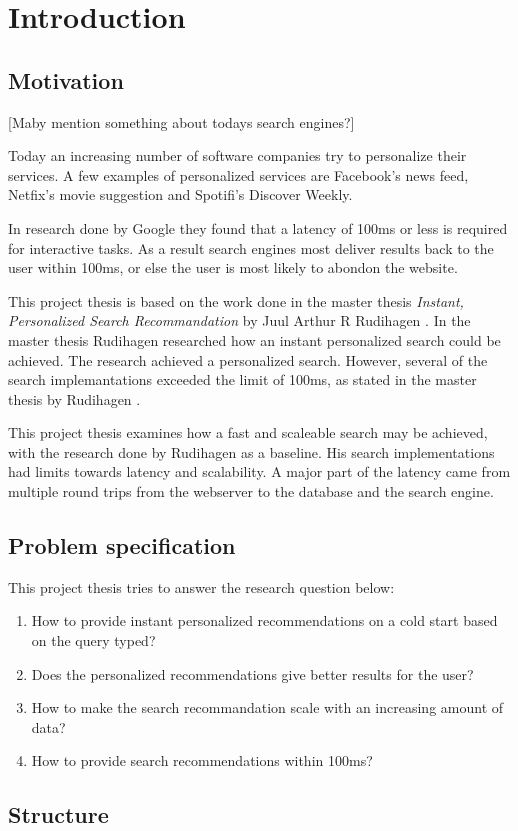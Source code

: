 \chapter{Introduction}
\section{Motivation}
[Maby mention something about todays search engines?]

Today an increasing number of software companies try to personalize their services.
A few examples of personalized services are Facebook's news feed, Netfix's movie suggestion and Spotifi's Discover Weekly.

In research done by Google \cite{google-latency} they found that a latency of 100ms or less is required for interactive tasks.
As a result search engines most deliver results back to the user within 100ms, or else the user is most likely to abondon the website.

This project thesis is based on the work done in the master thesis \textit{Instant, Personalized Search Recommandation} by Juul Arthur R Rudihagen \cite{master-thesis}.
In the master thesis Rudihagen researched how an instant personalized search could be achieved.
The research achieved a personalized search.
However, several of the search implemantations exceeded the limit of 100ms, as stated in the master thesis by Rudihagen \cite[sec 6.6]{master-thesis}.

This project thesis examines how a fast and scaleable search may be achieved, with the research done by Rudihagen as a baseline.
His search implementations had limits towards latency and scalability.
A major part of the latency came from multiple round trips from the webserver to the database and the search engine.

\section{Problem specification}
This project thesis tries to answer the research question below:

\begin{enumerate}
  \item How to provide instant personalized recommendations on a cold start based on the query typed?
  \item Does the personalized recommendations give better results for the user?
  \item How to make the search recommandation scale with an increasing amount of data?
  \item How to provide search recommendations within 100ms?
\end{enumerate}

\section{Structure}
